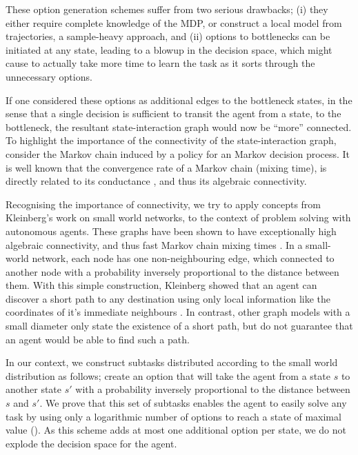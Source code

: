 These option generation schemes suffer from two serious drawbacks; (i)
they either require complete knowledge of the MDP, or construct a local
model from trajectories, a sample-heavy approach, and (ii) options to
bottlenecks can be initiated at any state, leading to a blowup in the
decision space, which might cause to actually take more time to learn
the task as it sorts through the unnecessary options. 

If one considered these options as additional edges to the bottleneck
states, in the sense that a single decision is sufficient to transit the
agent from a state, to the bottleneck, the resultant state-interaction
graph would now be ``more'' connected. To highlight the importance of
the connectivity of the state-interaction graph, consider the Markov
chain induced by a policy for an Markov decision process. It is well
known that the convergence rate of a Markov chain (mixing time), is
directly related to its conductance \cite{Jerrum1988}, and thus its
algebraic connectivity.

Recognising the importance of connectivity, we try to apply concepts
from Kleinberg's work on small world networks, to the context of problem
solving with autonomous agents. These graphs have been shown to have
exceptionally high algebraic connectivity, and thus fast Markov chain
mixing times \cite{Salehi2007}. In a small-world network, each node 
has one non-neighbouring edge, which connected to another node with
a probability inversely proportional to the distance between them. With
this simple construction, Kleinberg showed that an agent can discover
a short path to any destination using only local information like the
coordinates of it's immediate neighbours \cite{Kleinberg2000}. In
contrast, other graph models with a small diameter only state the
existence of a short path, but do not guarantee that an agent would be
able to find such a path. 

In our context, we construct subtasks distributed according to the small
world distribution as follows; create an option that will take the agent
from a state $s$ to another state $s'$ with a probability inversely
proportional to the distance between $s$ and $s'$. We prove that this
set of subtasks enables the agent to easily solve any task by using only
a logarithmic number of options to reach a state of maximal value
(). As this scheme adds at most one additional option
per state, we do not explode the decision space for the agent.

